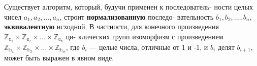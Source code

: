 \documentclass{mai_book}
\begin{document}
Существует алгоритм, который, будучи применен к последователь- \linebreak ности целых чисел $a_1, a_2, ..., a_n$, строит \textbf{нормализованную} последо- \linebreak вательность $b_1, b_2, ..., b_n$, \textbf{эквивалентную} исходной.  \newpage
В частности, для конечного произведения $\mathbb{Z_{a_1}} \times \mathbb{Z_{a_2}} \times ... \times \mathbb{Z_{a_n}}$ ци- \linebreak клических групп изоморфизм с произведением $\mathbb{Z_{b_1}} \times \mathbb{Z_{b_2}} \times ... \times \mathbb{Z_{b_m}}$, где \linebreak $b_i$ --- целые числа, отличные от 1 и -1, и $b_i$ делят $b_{i+1}$, может быть \linebreak выражен в явном виде.
\end{document}
